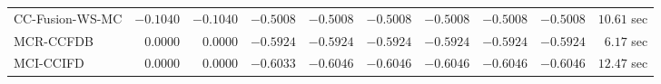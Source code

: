 \begin{table}[H]
\begin{tabular}{lrrrrrrrrr}
     CC-Fusion-WS-MC & $      -0.1040$ & $      -0.1040$ & $      -0.5008$ & $      -0.5008$ & $      -0.5008$ & $      -0.5008$ & $      -0.5008$ & $      -0.5008$ & $        10.61$ sec   \\ 
\cmidrule{1-1} 
           MCR-CCFDB & $       0.0000$ & $       0.0000$ & $      -0.5924$ & $      -0.5924$ & $      -0.5924$ & $      -0.5924$ & $      -0.5924$ & $      -0.5924$ & $         6.17$ sec   \\ 
\cmidrule{1-1} 
           MCI-CCIFD & $       0.0000$ & $       0.0000$ & $      -0.6033$ & $      -0.6046$ & $      -0.6046$ & $      -0.6046$ & $      -0.6046$ & $      -0.6046$ & $        12.47$ sec   \\ 
\bottomrule
\end{tabular}
\end{table}

